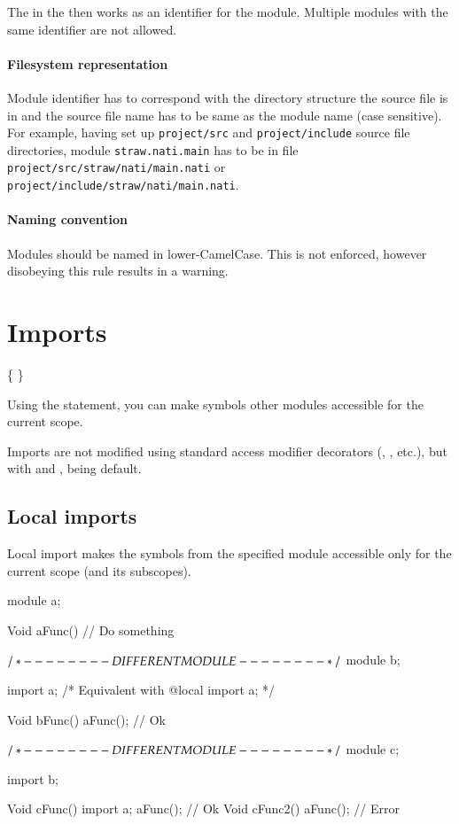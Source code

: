 The  in the  then works as an identifier for the module. Multiple modules with the same identifier are not allowed.

\paragraph{Filesystem representation} Module identifier has to correspond with the directory structure the source file is in and the source file name has to be same as the module name (case sensitive). For example, having set up \verb|project/src| and \verb|project/include| source file directories, module \verb|straw.nati.main| has to be in file \verb|project/src/straw/nati/main.nati| or \verb|project/include/straw/nati/main.nati|.

\paragraph{Naming convention} Modules should be named in lower-CamelCase. This is not enforced, however disobeying this rule results in a warning.

\section{Imports} \label{imports}
\begin{grammar}
	 \{  \}   \kwd{;}
\end{grammar}

Using the  statement, you can make symbols other modules accessible for the current scope.

Imports are not modified using standard access modifier decorators (, , etc.), but with  and ,  being default.

\subsection{Local imports} \label{decorator:local}
Local import makes the symbols from the specified module accessible only for the current scope (and its subscopes).

\begin{code}
module a;

Void aFunc() {
	// Do something
}

$/* - - - - - - - - DIFFERENT MODULE - - - - - - - - */$
module b;

import a; /* Equivalent with @local import a; */

Void bFunc() {
	aFunc(); // Ok
}

$/* - - - - - - - - DIFFERENT MODULE - - - - - - - - */$
module c;

import b;

Void cFunc() {
	import a;
	aFunc(); // Ok
}
Void cFunc2() {
	aFunc(); // Error	
}
\end{code}

